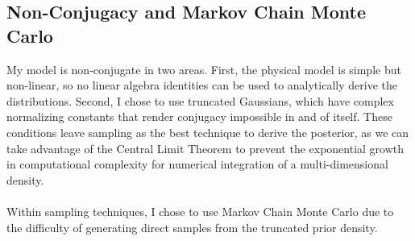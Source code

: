 \documentclass[12pt, letterpaper]{article}
\begin{document}
\subsection{Non-Conjugacy and Markov Chain Monte Carlo}
My model is non-conjugate in two areas. First, the physical model is simple but non-linear, so no linear algebra identities can be used to
analytically derive the distributions. Second, I chose to use truncated Gaussians, which have complex normalizing constants that render conjugacy impossible
in and of itself. These conditions leave sampling as the best technique to derive the posterior, as we can take advantage of the Central Limit
Theorem to prevent the exponential growth in computational complexity for numerical integration of a multi-dimensional density.
\\\\
Within sampling techniques, I chose to use Markov Chain Monte Carlo due to the difficulty of generating direct samples from the truncated prior density.
\end{document}
